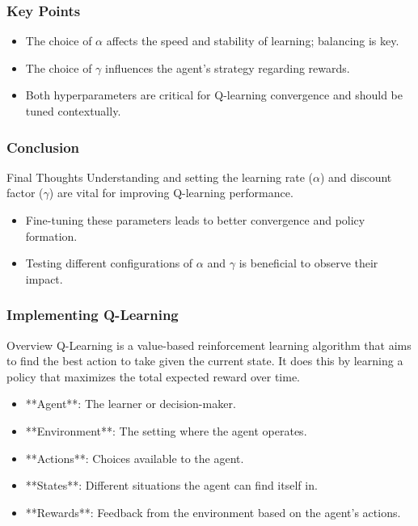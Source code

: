 \documentclass{beamer}
\begin{document}
\begin{frame}[fragile]
    \frametitle{Key Points}
    \begin{itemize}
        \item The choice of $\alpha$ affects the speed and stability of learning; balancing is key.
        \item The choice of $\gamma$ influences the agent's strategy regarding rewards.
        \item Both hyperparameters are critical for Q-learning convergence and should be tuned contextually.
    \end{itemize}
\end{frame}

\begin{frame}[fragile]
    \frametitle{Conclusion}
    \begin{block}{Final Thoughts}
        Understanding and setting the learning rate ($\alpha$) and discount factor ($\gamma$) are vital for improving Q-learning performance. 
    \end{block}
    \begin{itemize}
        \item Fine-tuning these parameters leads to better convergence and policy formation.
        \item Testing different configurations of $\alpha$ and $\gamma$ is beneficial to observe their impact.
    \end{itemize}
\end{frame}

\begin{frame}
    \frametitle{Implementing Q-Learning}
    \begin{block}{Overview}
        Q-Learning is a value-based reinforcement learning algorithm that aims to find the best action to take given the current state. It does this by learning a policy that maximizes the total expected reward over time.
    \end{block}
    
    \begin{itemize}
        \item **Agent**: The learner or decision-maker.
        \item **Environment**: The setting where the agent operates.
        \item **Actions**: Choices available to the agent.
        \item **States**: Different situations the agent can find itself in.
        \item **Rewards**: Feedback from the environment based on the agent's actions.
    \end{itemize}
\end{frame}
\end{document}
